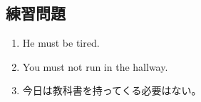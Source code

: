 \subsection{練習問題}
    \begin{enumerate}
            \item He must be tired.
            \vspace{0.5em}
            \item You must not run in the hallway.
            \vspace{0.5em}
            \item 今日は教科書を持ってくる必要はない。
        \end{enumerate}

\newpage
